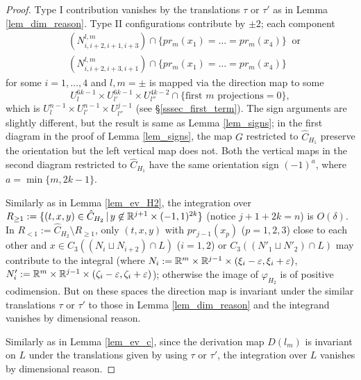 \begin{proof}
Type I contribution vanishes by the translations $\tau$ or $\tau'$ as in Lemma \ref{lem_dim_reason}.
Type II configurations contribute by $\pm 2$; each component
\begin{align*}
 &(N^{l,m}_{i,i+2,i+1,i+3}) \cap \{ pr_m (x_1 )=\dots =pr_m (x_4 )\} \ \text{ or} \\
 &(N^{l,m}_{i,i+2,i+3,i+1}) \cap \{ pr_m (x_1 )=\dots =pr_m (x_4 )\}
\end{align*}
for some $i=1,\dots ,4$ and $l,m=\pm$ is mapped via the direction map to some
\[
 U^{6k-1}_l \times U^{6k-1}_{l'} \times U^{4k-2}_{l''}\cap \{ \text{first } m \text{ projections}=0\} ,
\]
which is $U^{n-1}_l \times U^{n-1}_{l'} \times U^{j-1}_{l''}$ (see \S \ref{sssec_first_term}).
The sign arguments are slightly different, but the result is same as Lemma \ref{lem_signs};
in the first diagram in the proof of Lemma \ref{lem_signs}, the map $G$ restricted to $\hat{C}_{H_1}$ preserve the
orientation but the left vertical map does not.
Both the vertical maps in the second diagram restricted to $\hat{C}_{H_1}$ have the same orientation sign $(-1)^a$,
where $a=\min \{ m,2k-1\}$.



Similarly as in Lemma \ref{lem_ev_H2}, the integration over
$R_{\ge 1}:=\{ (t,x,y)\in \hat{C}_{H_2}\, | \, y\not\in \mathbb{R}^{j+1}\times (-1,1)^{2k}\}$ (notice $j+1+2k=n$) is
$O(\delta )$.
In $R_{<1}:=\hat{C}_{H_2}\setminus R_{\ge 1}$, only $(t,x,y)$ with $pr_{j-1}(x_p )$ ($p=1,2,3$) close to each other and
$x \in C_3 ((N_i \sqcup N_{i+2})\cap L)$ ($i=1,2$) or $C_3((N'_1 \sqcup N'_2 )\cap L)$ may contribute to the integral
(where $N_i := \mathbb{R}^m \times \mathbb{R}^{j-1}\times (\xi_i -\varepsilon ,\xi_i +\varepsilon )$,
$N'_i := \mathbb{R}^m \times \mathbb{R}^{j-1}\times (\zeta_i -\varepsilon ,\zeta_i +\varepsilon )$); otherwise the image of
$\varphi_{H_2}$ is of positive codimension.
But on these spaces the direction map is invariant under the similar translations $\tau$ or $\tau'$ to those in
Lemma \ref{lem_dim_reason} and the integrand vanishes by dimensional reason.


Similarly as in Lemma \ref{lem_ev_c}, since the derivation map $D(l_m )$ is invariant on $L$ under the translations
given by using $\tau$ or $\tau'$, the integration over $L$ vanishes by dimensional reason.



\end{proof}
